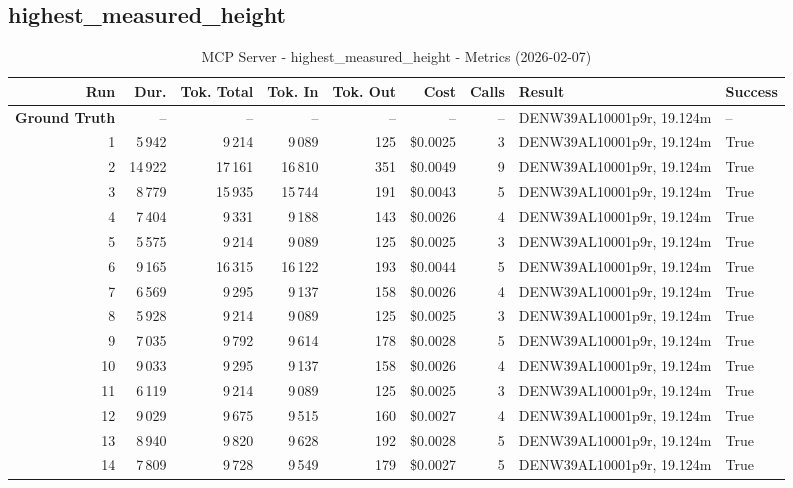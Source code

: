 \documentclass[a4paper,11pt]{article}
\begin{document}
\clearpage
\subsection{highest\_measured\_height}

\begin{table}[ht]
\centering
\scriptsize
\caption{MCP Server - highest\_measured\_height - Metrics (2026-02-07)}
\label{tab:mcp\_highest\_measured\_height\_metrics\_2026-02-07}
\begin{tabular}{r r r r r r r p{3cm} l}
\hline
Run & Dur. & Tok. Total & Tok. In & Tok. Out & Cost & Calls & Result & Success \\
\hline
\textbf{Ground Truth} & -- & -- & -- & -- & -- & -- & DENW39AL10001p9r, 19.124m & -- \\
\hline
1 & 5\,942 & 9\,214 & 9\,089 & 125 & \$0.0025 & 3 & DENW39AL10001p9r, 19.124m & True \\
2 & 14\,922 & 17\,161 & 16\,810 & 351 & \$0.0049 & 9 & DENW39AL10001p9r, 19.124m & True \\
3 & 8\,779 & 15\,935 & 15\,744 & 191 & \$0.0043 & 5 & DENW39AL10001p9r, 19.124m & True \\
4 & 7\,404 & 9\,331 & 9\,188 & 143 & \$0.0026 & 4 & DENW39AL10001p9r, 19.124m & True \\
5 & 5\,575 & 9\,214 & 9\,089 & 125 & \$0.0025 & 3 & DENW39AL10001p9r, 19.124m & True \\
6 & 9\,165 & 16\,315 & 16\,122 & 193 & \$0.0044 & 5 & DENW39AL10001p9r, 19.124m & True \\
7 & 6\,569 & 9\,295 & 9\,137 & 158 & \$0.0026 & 4 & DENW39AL10001p9r, 19.124m & True \\
8 & 5\,928 & 9\,214 & 9\,089 & 125 & \$0.0025 & 3 & DENW39AL10001p9r, 19.124m & True \\
9 & 7\,035 & 9\,792 & 9\,614 & 178 & \$0.0028 & 5 & DENW39AL10001p9r, 19.124m & True \\
10 & 9\,033 & 9\,295 & 9\,137 & 158 & \$0.0026 & 4 & DENW39AL10001p9r, 19.124m & True \\
11 & 6\,119 & 9\,214 & 9\,089 & 125 & \$0.0025 & 3 & DENW39AL10001p9r, 19.124m & True \\
12 & 9\,029 & 9\,675 & 9\,515 & 160 & \$0.0027 & 4 & DENW39AL10001p9r, 19.124m & True \\
13 & 8\,940 & 9\,820 & 9\,628 & 192 & \$0.0028 & 5 & DENW39AL10001p9r, 19.124m & True \\
14 & 7\,809 & 9\,728 & 9\,549 & 179 & \$0.0027 & 5 & DENW39AL10001p9r, 19.124m & True \\

\end{tabular}
\end{table}
\end{document}
